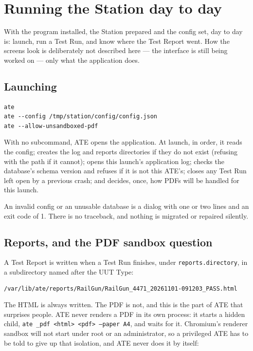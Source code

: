 \chapter{Running the Station day to day}\label{ch:running}

With the program installed, the Station prepared and the config set, day to day is: launch, run a
Test Run, and know where the Test Report went. How the screens look is deliberately not described
here --- the interface is still being worked on --- only what the application does.

\section{Launching}

\begin{lstlisting}[language=ATEShell]
ate
ate --config /tmp/station/config/config.json
ate --allow-unsandboxed-pdf
\end{lstlisting}

With no subcommand, ATE opens the application. At launch, in order, it reads the config; creates the
log and reports directories if they do not exist (refusing with the path if it cannot); opens this
launch's application log; checks the database's schema version and refuses if it is not this ATE's;
closes any Test Run left open by a previous crash; and decides, once, how PDFs will be handled for
this launch.

An invalid config or an unusable database is a dialog with one or two lines and an exit code of 1.
There is no traceback, and nothing is migrated or repaired silently.

\section{Reports, and the PDF sandbox question}

A Test Report is written when a Test Run finishes, under \texttt{reports.directory}, in a
subdirectory named after the UUT Type:

\begin{lstlisting}[language=ATEShell]
/var/lib/ate/reports/RailGun/RailGun_4471_20261101-091203_PASS.html
\end{lstlisting}

The HTML is always written. The PDF is not, and this is the part of ATE that surprises people.
ATE never renders a PDF in its own process: it starts a hidden child, \texttt{ate \_pdf <html>
<pdf> --paper A4}, and waits for it. Chromium's renderer sandbox will not start under root or an
administrator, so a privileged ATE has to be told to give up that isolation, and ATE never does it
by itself:


